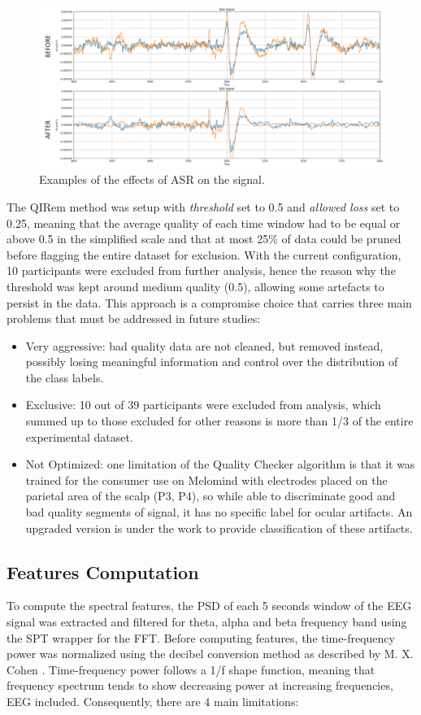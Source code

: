 \begin{figure}[h!]
\includegraphics[width=15cm]{img/methods/asr_example.png}
\centering
\caption{Examples of the effects of ASR on the signal.} \label{fig_asr_example}
\end{figure}

The \ac{QIRem} method was setup with \emph{threshold} set to 0.5 and \emph{allowed loss} set to 0.25, meaning that the average quality of each time window had to be equal or above 0.5 in the simplified scale and that at most 25\% of data could be pruned before flagging the entire dataset for exclusion. With the current configuration, 10 participants were excluded from further analysis, hence the reason why the threshold was kept around medium quality (0.5), allowing some artefacts to persist in the data. This approach is a compromise choice that carries three main problems that must be addressed in future studies:
\begin{itemize}
\item 	Very aggressive: bad quality data are not cleaned, but removed instead, possibly losing meaningful information and control over the distribution of the class labels.
\item 	Exclusive: 10 out of 39 participants were excluded from analysis, which summed up to those excluded for other reasons is more than 1/3 of the entire experimental dataset.
\item 	Not Optimized: one limitation of the Quality Checker algorithm is that it was trained for the consumer use on Melomind with electrodes placed on the parietal area of the scalp (P3, P4), so while able to discriminate good and bad quality segments of signal, it has no specific label for ocular artifacts. An upgraded version is under the work to provide classification of these artifacts.
\end{itemize}

\subsection{Features Computation}
\label{sec:features_computation}
To compute the spectral features, the \ac{PSD} of each 5 seconds window of the \ac{EEG} signal was extracted and filtered for theta, alpha and beta frequency band using the \ac{SPT} wrapper for the \ac{FFT}. Before computing features, the time-frequency power was normalized using the decibel conversion method as described by M. X. Cohen \cite{cohen_analyzing_2014}. Time-frequency power follows a 1/f shape function, meaning that frequency spectrum tends to show decreasing power at increasing frequencies, \ac{EEG} included. Consequently, there are 4 main limitations:


